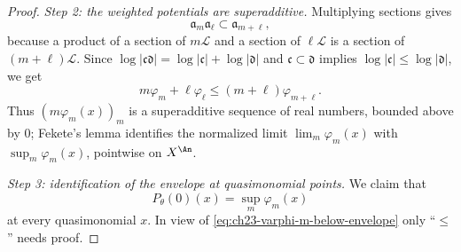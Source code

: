 \begin{proof}
\emph{Step 2: the weighted potentials are superadditive.}
Multiplying sections gives
\begin{equation}\label{eq:ch23-graded-base-ideals}
                \mathfrak a_m\mathfrak a_\ell
                \subset\mathfrak a_{m+\ell},
\end{equation}
because a product of a section of $m\mathcal L$ and a section of
$\ell\mathcal L$ is a section of $(m+\ell)\mathcal L$.  Since
$\log|\mathfrak c\mathfrak d|=\log|\mathfrak c|+\log|\mathfrak d|$ and
$\mathfrak c\subset\mathfrak d$ implies
$\log|\mathfrak c|\leq\log|\mathfrak d|$, we get
\begin{equation}\label{eq:ch23-superadditive-potentials}
             m\varphi_m+\ell\varphi_\ell
             \leq(m+\ell)\varphi_{m+\ell}.
\end{equation}
Thus $(m\varphi_m(x))_m$ is a superadditive sequence of real numbers,
bounded above by $0$; Fekete's lemma identifies the normalized limit
$\lim_m\varphi_m(x)$ with $\sup_m\varphi_m(x)$, pointwise on
$X^{\An}$.

\emph{Step 3: identification of the envelope at quasimonomial points.}
We claim that
\begin{equation}\label{eq:ch23-envelope-base-sup}
                         P_\theta(0)(x)=\sup_m\varphi_m(x)
\end{equation}
at every quasimonomial $x$.  In view of
\eqref{eq:ch23-varphi-m-below-envelope} only ``$\leq$'' needs proof.


\end{proof}
